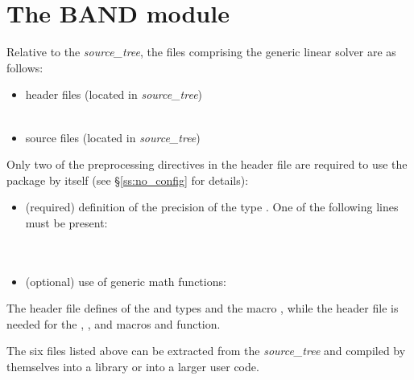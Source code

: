 
\section{The BAND module}\label{ss:band}

Relative to the {\sundials} {\em source\_tree}, the files comprising the
{\band} generic linear solver are as follows:
\begin{itemize}
\item header files (located in {\em source\_tree})\\
   \\
     
\item source files (located in {\em source\_tree})\\
   
\end{itemize}
Only two of the preprocessing directives in the header file  
are required to use the {\band} package by itself (see \S\ref{ss:no_config} for details):
\begin{itemize}
\item (required) definition of the precision of the {\sundials} type . 
  One of the following lines must be present:\\
  \\
  \\
\item (optional) use of generic math functions:\\
\end{itemize}
The  header file defines of the {\sundials}
 and  types and the macro , while the 
 header file is needed for the , , and  macros 
and  function.

The six files listed above can be extracted from the {\sundials} {\em source\_tree} and
compiled by themselves into a {\band} library or into a larger user code.


